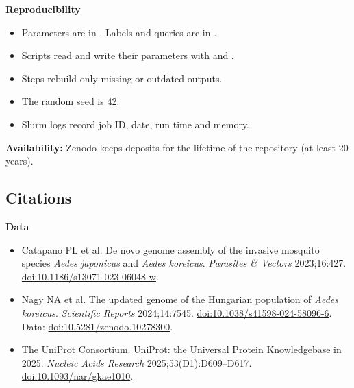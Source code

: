 \documentclass[11pt,a4paper]{article}
\makeatletter
\newcommand{\doi}[1]{\href{https://doi.org/#1}{doi:#1}}
\newcommand{\lbl}[1]{\par\if@nobreak\else\needspace{6\baselineskip}\fi\textbf{#1}\par\nopagebreak\@nobreaktrue}
\makeatother
\begin{document}
\lbl{Reproducibility}
\begin{itemize}
\item Parameters are in . Labels and queries are in .
\item Scripts read and write their parameters with  and .
\item Steps rebuild only missing or outdated outputs.
\item The random seed is 42.
\item Slurm logs record job ID, date, run time and memory.
\end{itemize}

\textbf{Availability:} Zenodo keeps deposits for the lifetime of the repository (at least 20 years).

\subsection{Citations}

\lbl{Data}
\begin{itemize}
\item Catapano PL et al. De novo genome assembly of the invasive mosquito species \emph{Aedes japonicus} and \emph{Aedes koreicus}. \emph{Parasites \& Vectors} 2023;16:427. \doi{10.1186/s13071-023-06048-w}.
\item Nagy NA et al. The updated genome of the Hungarian population of \emph{Aedes koreicus}. \emph{Scientific Reports} 2024;14:7545. \doi{10.1038/s41598-024-58096-6}. Data: \doi{10.5281/zenodo.10278300}.
\item The UniProt Consortium. UniProt: the Universal Protein Knowledgebase in 2025. \emph{Nucleic Acids Research} 2025;53(D1):D609--D617. \doi{10.1093/nar/gkae1010}.
\end{itemize}
\end{document}
